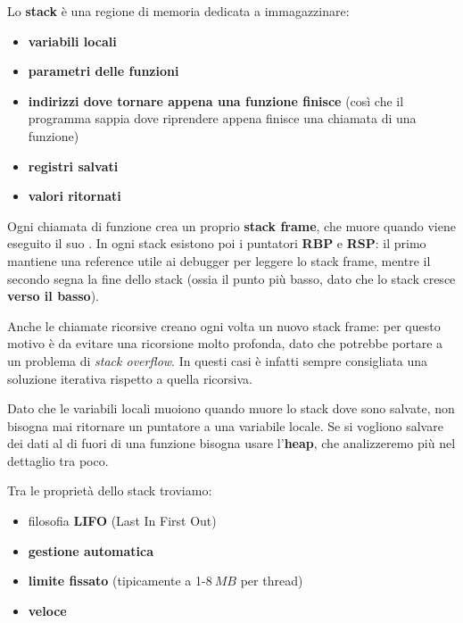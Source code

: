 \documentclass[11pt, a4paper, titlepage, oneside]{scrbook}
\begin{document}
\begin{Definizione}[Stack]
\label{def-stack}
Lo \textbf{stack} è una regione di memoria dedicata a immagazzinare:
\begin{itemize}
    \item \textbf{variabili locali}
    \item \textbf{parametri delle funzioni}
    \item \textbf{indirizzi dove tornare appena una funzione finisce} (così che il programma sappia dove riprendere appena finisce una chiamata di una funzione)
    \item \textbf{registri salvati}
    \item \textbf{valori ritornati}
\end{itemize}
Ogni chiamata di funzione crea un proprio \textbf{stack frame}, che muore quando viene eseguito il suo . In ogni stack esistono poi i puntatori \textbf{RBP} e \textbf{RSP}: il primo mantiene una reference utile ai debugger per leggere lo stack frame, mentre il secondo segna la fine dello stack (ossia il punto più basso, dato che lo stack cresce \textbf{verso il basso}). 
\end{Definizione}

Anche le chiamate ricorsive creano ogni volta un nuovo stack frame: per questo motivo è da evitare una ricorsione molto profonda, dato che potrebbe portare a un problema di \textit{stack overflow}. In questi casi è infatti sempre consigliata una soluzione iterativa rispetto a quella ricorsiva.

\NB Dato che le variabili locali muoiono quando muore lo stack dove sono salvate, non bisogna mai ritornare un puntatore a una variabile locale. Se si vogliono salvare dei dati al di fuori di una funzione bisogna usare l'\textbf{heap}, che analizzeremo più nel dettaglio tra poco.

\begin{Proprieta}
\label{prop-stack}
Tra le proprietà dello stack troviamo:
\begin{itemize}
    \item filosofia \textbf{LIFO} (Last In First Out)
    \item \textbf{gestione automatica}
    \item \textbf{limite fissato} (tipicamente a 1-$\SI{8}{MB}$ per thread)
    \item \textbf{veloce}
\end{itemize}
\end{Proprieta}
\end{document}
